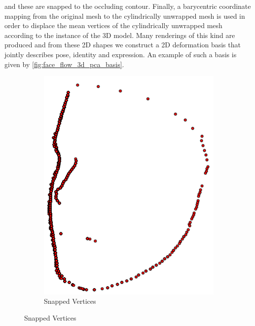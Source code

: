 and these are snapped to the occluding contour. Finally, a
barycentric coordinate mapping from the original mesh to the cylindrically
unwrapped mesh is used in order to displace the mean vertices of the cylindrically
unwrapped mesh according to the instance of the 3D model. Many renderings of this
kind are produced and from these 2D shapes we construct a 2D deformation basis
that jointly describes pose, identity and expression. An example of such a basis
is given by \cref{fig:face_flow_3d_pca_basis}.
\begin{figure}[t]
    \centering
    \hspace*{\fill}
    \begin{subfigure}[b]{0.23\textwidth}
        \centering
        \includegraphics[width=\textwidth]{face_flow/images/contour_snapping/posed_snapped_contour}
        \caption{Snapped Vertices}\label{subfig:face_flow_snapped_contour}
    \end{subfigure} \hfill

\end{figure}
